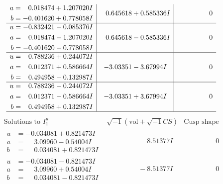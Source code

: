 \documentclass[1p]{elsarticle_modified}
\theoremstyle{definition}
\newcommand{\I}{\sqrt{-1}}
\begin{document}
$$\begin{array}{c|c|c}
\begin{aligned}
a &= \phantom{-}0.018474 + 1.207020 I \\
b &= -0.401620 + 0.778058 I\end{aligned}
 & \phantom{-}0.645618 + 0.585336 I & \phantom{-0.000000 } 0 \\ \hline\begin{aligned}
u &= -0.832421 - 0.085376 I \\
a &= \phantom{-}0.018474 - 1.207020 I \\
b &= -0.401620 - 0.778058 I\end{aligned}
 & \phantom{-}0.645618 - 0.585336 I & \phantom{-0.000000 } 0 \\ \hline\begin{aligned}
u &= \phantom{-}0.788236 + 0.244072 I \\
a &= \phantom{-}0.012371 + 0.586664 I \\
b &= \phantom{-}0.494958 - 0.132987 I\end{aligned}
 & -3.03351 - 3.67994 I & \phantom{-0.000000 } 0 \\ \hline\begin{aligned}
u &= \phantom{-}0.788236 - 0.244072 I \\
a &= \phantom{-}0.012371 - 0.586664 I \\
b &= \phantom{-}0.494958 + 0.132987 I\end{aligned}
 & -3.03351 + 3.67994 I & \phantom{-0.000000 } 0\\
 \hline 
 \end{array}$$\newpage$$\begin{array}{c|c|c}  
\text{Solutions to }I^u_{1}& \I (\text{vol} + \sqrt{-1}CS) & \text{Cusp shape}\\
 \hline 
\begin{aligned}
u &= -0.034081 + 0.821473 I \\
a &= \phantom{-}3.09960 - 0.54004 I \\
b &= \phantom{-}0.034081 + 0.821473 I\end{aligned}
 & \phantom{-0.000000 -}8.51377 I & \phantom{-0.000000 } 0 \\ \hline\begin{aligned}
u &= -0.034081 - 0.821473 I \\
a &= \phantom{-}3.09960 + 0.54004 I \\
b &= \phantom{-}0.034081 - 0.821473 I\end{aligned}
 & \phantom{-0.000000 } -8.51377 I & \phantom{-0.000000 } 0 \\ \hline\begin{aligned}

\end{aligned}
\end{array}$$
\end{document}
